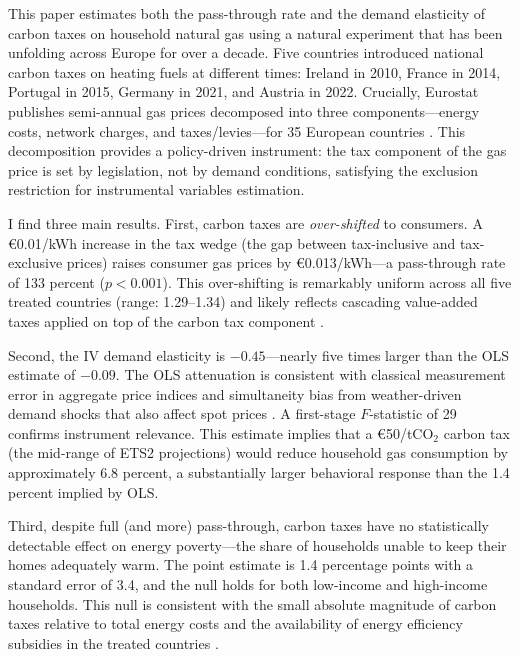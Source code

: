 \documentclass[12pt]{article}
\begin{document}
This paper estimates both the pass-through rate and the demand elasticity of carbon taxes on household natural gas using a natural experiment that has been unfolding across Europe for over a decade. Five countries introduced national carbon taxes on heating fuels at different times: Ireland in 2010, France in 2014, Portugal in 2015, Germany in 2021, and Austria in 2022. Crucially, Eurostat publishes semi-annual gas prices decomposed into three components---energy costs, network charges, and taxes/levies---for 35 European countries \citep{eurostat_nrg_pc_202}. This decomposition provides a policy-driven instrument: the tax component of the gas price is set by legislation, not by demand conditions, satisfying the exclusion restriction for instrumental variables estimation.

I find three main results. First, carbon taxes are \textit{over-shifted} to consumers. A \euro{}0.01/kWh increase in the tax wedge (the gap between tax-inclusive and tax-exclusive prices) raises consumer gas prices by \euro{}0.013/kWh---a pass-through rate of 133 percent ($p < 0.001$). This over-shifting is remarkably uniform across all five treated countries (range: 1.29--1.34) and likely reflects cascading value-added taxes applied on top of the carbon tax component \citep{carbonnier2007vat, stolper2016incidence}.

Second, the IV demand elasticity is $-0.45$---nearly five times larger than the OLS estimate of $-0.09$. The OLS attenuation is consistent with classical measurement error in aggregate price indices and simultaneity bias from weather-driven demand shocks that also affect spot prices \citep{hausman2001mismeasured}. A first-stage $F$-statistic of 29 confirms instrument relevance. This estimate implies that a \euro{}50/tCO$_2$ carbon tax (the mid-range of ETS2 projections) would reduce household gas consumption by approximately 6.8 percent, a substantially larger behavioral response than the 1.4 percent implied by OLS.

Third, despite full (and more) pass-through, carbon taxes have no statistically detectable effect on energy poverty---the share of households unable to keep their homes adequately warm. The point estimate is 1.4 percentage points with a standard error of 3.4, and the null holds for both low-income and high-income households. This null is consistent with the small absolute magnitude of carbon taxes relative to total energy costs and the availability of energy efficiency subsidies in the treated countries \citep{flues2017oecd}.
\end{document}
